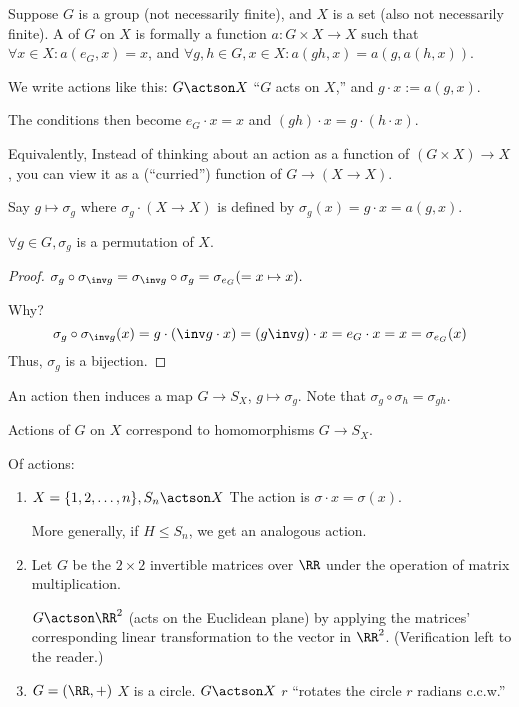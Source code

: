 \documentclass[notes.tex]{subfiles}
\begin{document}
\begin{defn}
	Suppose $G$ is a group (not necessarily finite), and $X$ is a set (also not necessarily finite). A  of $G$ on $X$ is formally a function $a :G\times X\to X$ such that $\forall x\in X: a(e_G, x) = x$, and $\forall g, h\in G, x\in X: a(gh, x) = a(g, a(h, x))$.
\end{defn}

\begin{notation}
	We write actions like this: 
	$G\actson X$ ``$G$ acts on $X$,'' and $g\cdot x := a(g, x)$.

	The conditions then become $e_G\cdot x = x$ and $(gh)\cdot x = g\cdot(h\cdot x)$.
\end{notation}
Equivalently, Instead of thinking about an action as a function of $(G\times X) \to X$, you can view it as a (``curried'') function of $G \to (X\to X)$.

Say $g\mapsto \sigma_g$ where $\sigma_g\cdot (X\to X)$ is defined by $\sigma_g(x) = g\cdot x = a(g, x)$.

\begin{claim}
	$\forall g\in G, \sigma_g$ is a permutation of $X$.
\end{claim}
\begin{proof}
	$\sigma_g\circ \sigma_{\inv g}  = \sigma_{\inv g} \circ \sigma_g = \sigma_{e_G} (= x\mapsto x).$

	Why? 
	\[
		\sigma_g\circ\sigma_{\inv g}(x) = g\cdot(\inv g\cdot x) = (g\inv g)\cdot x = e_G\cdot x = x = \sigma_{e_G}(x)
	\]
	Thus, $\sigma_g$ is a bijection.
\end{proof}

An action then induces a map $G\to S_X$, $g\mapsto \sigma_g$.
Note that $\sigma_g\circ\sigma_h = \sigma_{gh}$.

\begin{property}
	Actions of $G$ on $X$ correspond to homomorphisms $G\to S_X$.
\end{property}

\begin{eg}
	Of actions:
	\begin{enumerate}
		\item $X = \{1, 2, \ldots, n\}, S_n\actson X$
		The action is $\sigma\cdot x = \sigma(x)$.

		More generally, if $H\le S_n$, we get an analogous action.
		\item Let $G$ be the  $2\times2$ invertible matrices over $\RR$ under the operation of matrix multiplication.

		$G\actson \RR^2$ (acts on the Euclidean plane) by applying the matrices' corresponding linear transformation to the vector in $\RR^2$. (Verification left to the reader.)
		\item $G = (\RR, +)$ $X$ is a circle.
		$G\actson X$ $r$ ``rotates the circle $r$ radians c.c.w.''
	\end{enumerate}
\end{eg}
\end{document}

